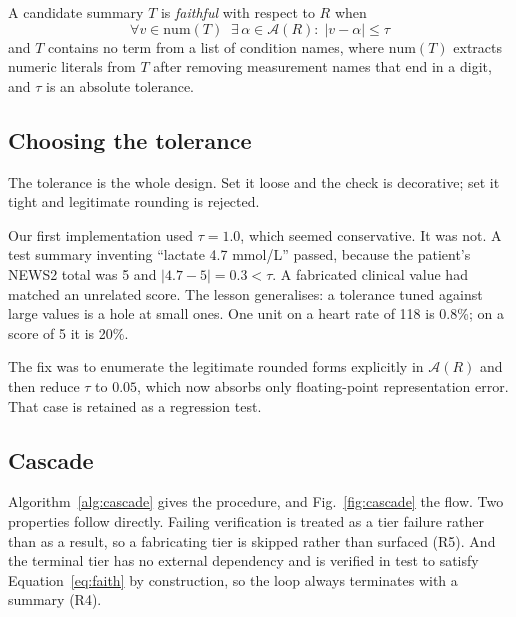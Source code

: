 \documentclass[lettersize,journal]{IEEEtran}
\begin{document}
A candidate summary $T$ is \emph{faithful} with respect to $R$ when
\begin{equation}
\forall v \in \mathrm{num}(T) \;\; \exists\, \alpha \in \mathcal{A}(R)
: \; |v - \alpha| \le \tau
\label{eq:faith}
\end{equation}
and $T$ contains no term from a list of condition names, where $\mathrm{num}(T)$
extracts numeric literals from $T$ after removing measurement names that end in
a digit, and $\tau$ is an absolute tolerance.

\subsection{Choosing the tolerance}

The tolerance is the whole design. Set it loose and the check is decorative; set
it tight and legitimate rounding is rejected.

Our first implementation used $\tau = 1.0$, which seemed conservative. It was
not. A test summary inventing ``lactate 4.7 mmol/L'' passed, because the
patient's NEWS2 total was 5 and $|4.7 - 5| = 0.3 < \tau$. A fabricated clinical
value had matched an unrelated score. The lesson generalises: a tolerance tuned
against large values is a hole at small ones. One unit on a heart rate of 118 is
0.8\%; on a score of 5 it is 20\%.

The fix was to enumerate the legitimate rounded forms explicitly in
$\mathcal{A}(R)$ and then reduce $\tau$ to $0.05$, which now absorbs only
floating-point representation error. That case is retained as a regression test.

\subsection{Cascade}

Algorithm~\ref{alg:cascade} gives the procedure, and Fig.~\ref{fig:cascade}
the flow. Two properties follow directly. Failing verification is treated as a
tier failure rather than as a result, so a fabricating tier is skipped rather
than surfaced (R5). And the terminal tier has no external dependency and is
verified in test to satisfy Equation~\ref{eq:faith} by construction, so the loop
always terminates with a summary (R4).
\end{document}
